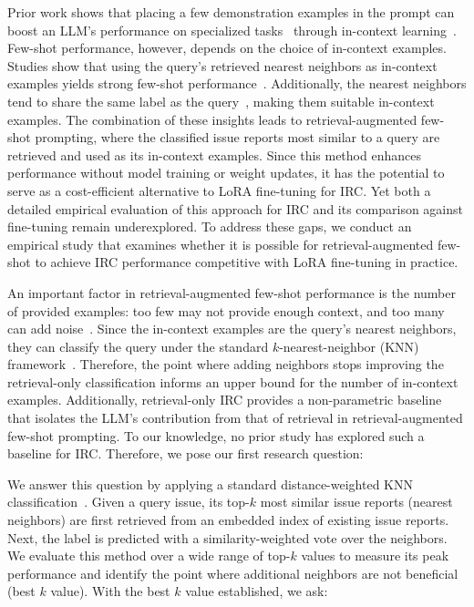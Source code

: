Prior work shows that placing a few demonstration examples in the prompt can boost an LLM's performance on specialized tasks~\cite{assi2026llm, le2023log, ma2023fairnessguidedfewshotpromptinglarge, logan2021cuttingpromptsparameterssimple, brown2020language} through in-context learning~\cite{brown2020language}. Few-shot performance, however, depends on the choice of in-context examples. Studies show that using the query's retrieved nearest neighbors as in-context examples yields strong few-shot performance~\cite{liu2022makes, yu2023retrieval}. Additionally, the nearest neighbors tend to share the same label as the query~\cite{cover1967nearest}, making them suitable in-context examples. The combination of these insights leads to retrieval-augmented few-shot prompting, where the classified issue reports most similar to a query are retrieved and used as its in-context examples. Since this method enhances performance without model training or weight updates, it has the potential to serve as a cost-efficient alternative to LoRA fine-tuning for IRC. Yet both a detailed empirical evaluation of this approach for IRC and its comparison against fine-tuning remain underexplored. To address these gaps, we conduct an empirical study that examines whether it is possible for retrieval-augmented few-shot to achieve IRC performance competitive with LoRA fine-tuning in practice.


An important factor in retrieval-augmented few-shot performance is the number of provided examples: too few may not provide enough context, and too many can add noise~\cite{liu2022makes}. Since the in-context examples are the query's nearest neighbors, they can classify the query under the standard $k$-nearest-neighbor (KNN) framework~\cite{cover1967nearest, dudani1976distance}. Therefore, the point where adding neighbors stops improving the retrieval-only classification informs an upper bound for the number of in-context examples. Additionally, retrieval-only IRC provides a non-parametric baseline that isolates the LLM's contribution from that of retrieval in retrieval-augmented few-shot prompting. To our knowledge, no prior study has explored such a baseline for IRC. Therefore, we pose our first research question:

 We answer this question by applying a standard distance-weighted KNN classification~\cite{cover1967nearest, dudani1976distance}. Given a query issue, its top-$k$ most similar issue reports (nearest neighbors) are first retrieved from an embedded index of existing issue reports. Next, the label is predicted with a similarity-weighted vote over the neighbors. We evaluate this method over a wide range of top-$k$ values to measure its peak performance and identify the point where additional neighbors are not beneficial (best $k$ value). With the best $k$ value established, we ask:

